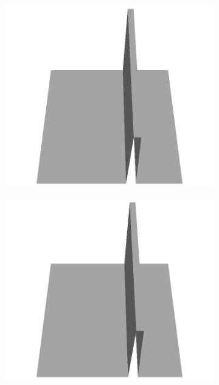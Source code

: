 \documentclass[../document.tex]{subfiles}
\begin{document}
\begin{figure}[H]
\begin{subfigure}[b]{0.065\textwidth}
    \includegraphics[width=\linewidth]{../img/5/custom_patches/walls_front/all/49-3d.png}
    \end{subfigure}
    \begin{subfigure}[b]{0.065\textwidth}
    \includegraphics[width=\linewidth]{../img/5/custom_patches/walls_front/all/48-3d.png}
    \end{subfigure}
    \begin{subfigure}[b]{0.065\textwidth}

\end{subfigure}
\end{figure}
\end{document}
